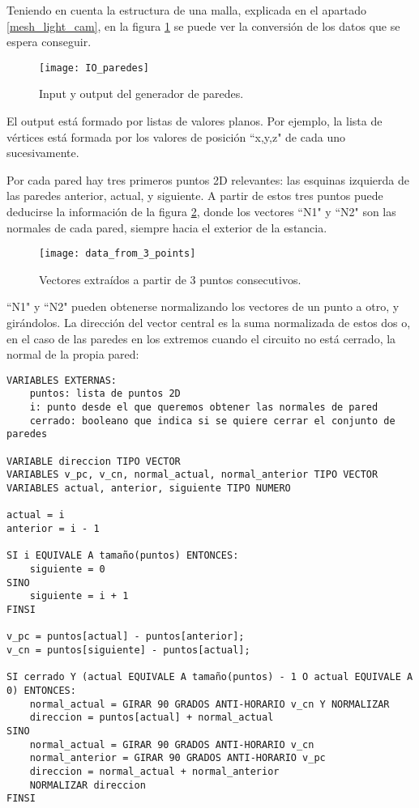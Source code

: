 Teniendo en cuenta la estructura de una malla, explicada en el apartado \ref{mesh_light_cam}, en la figura \ref{fig:io_generatewalls} se puede ver la conversión de los datos que se espera conseguir.

\begin{figure}[H]
    \centering
    \texttt{[image: IO\_paredes]}
    \caption{Input y output del generador de paredes.}
    \label{fig:io_generatewalls}
\end{figure}

El output está formado por listas de valores planos. Por ejemplo, la lista de vértices está formada por los valores de posición ``x,y,z" de cada uno sucesivamente.

Por cada pared hay tres primeros puntos 2D relevantes: las esquinas izquierda de las paredes anterior, actual, y siguiente. A partir de estos tres puntos puede deducirse la información de la figura \ref{fig:wall_vectors}, donde los vectores ``N1" y ``N2" son las normales de cada pared, siempre hacia el exterior de la estancia.

\begin{figure}[H]
    \centering
    \texttt{[image: data\_from\_3\_points]}
    \caption{Vectores extraídos a partir de 3 puntos consecutivos.}
    \label{fig:wall_vectors}
\end{figure}

``N1" y ``N2" pueden obtenerse normalizando los vectores de un punto a otro, y girándolos. La dirección del vector central es la suma normalizada de estos dos o, en el caso de las paredes en los extremos cuando el circuito no está cerrado, la normal de la propia pared:

\begin{lstlisting}
VARIABLES EXTERNAS:
    puntos: lista de puntos 2D
    i: punto desde el que queremos obtener las normales de pared
    cerrado: booleano que indica si se quiere cerrar el conjunto de paredes

VARIABLE direccion TIPO VECTOR
VARIABLES v_pc, v_cn, normal_actual, normal_anterior TIPO VECTOR
VARIABLES actual, anterior, siguiente TIPO NUMERO

actual = i
anterior = i - 1

SI i EQUIVALE A tamaño(puntos) ENTONCES:
    siguiente = 0
SINO
    siguiente = i + 1
FINSI

v_pc = puntos[actual] - puntos[anterior];
v_cn = puntos[siguiente] - puntos[actual];

SI cerrado Y (actual EQUIVALE A tamaño(puntos) - 1 O actual EQUIVALE A 0) ENTONCES:
    normal_actual = GIRAR 90 GRADOS ANTI-HORARIO v_cn Y NORMALIZAR
    direccion = puntos[actual] + normal_actual
SINO
    normal_actual = GIRAR 90 GRADOS ANTI-HORARIO v_cn
    normal_anterior = GIRAR 90 GRADOS ANTI-HORARIO v_pc
    direccion = normal_actual + normal_anterior
    NORMALIZAR direccion
FINSI
\end{lstlisting}

